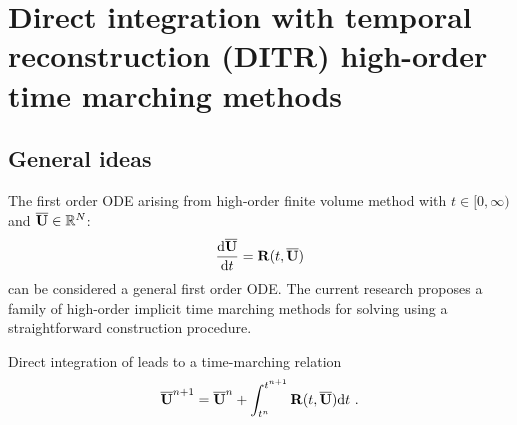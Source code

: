 

\section{Direct integration with temporal reconstruction (DITR)
  high-order time marching methods}
\label{sec:HIRK}

\subsection{General ideas}

The first order ODE  arising
from high-order finite volume method
with
$t\in[0,\infty)$ and $\overline{\mathbf{U}}\in \mathbb{R}^N$:
\begin{equation}    
    \frac{\dd \overline{\mathbf{U}}}{\dd t} = \mathbf{R}(t, \overline{\mathbf{U}})
\end{equation}
can be considered a general first order ODE.
The current research proposes a family of high-order implicit time marching
methods for solving 
using a straightforward construction procedure.

Direct integration of 
leads to a time-marching relation
\begin{equation}
    \overline{\mathbf{U}}^{n+1} = \overline{\mathbf{U}}^{n} + \int_{t^n}^{t^{n+1}}{
    \mathbf{R}(t, \overline{\mathbf{U}}) \dd t
    }\ .
    \label{eq:DI}
\end{equation}

